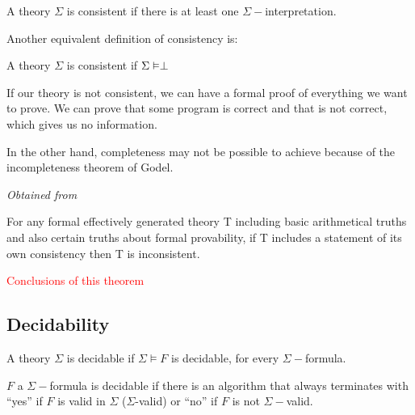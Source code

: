 \begin{defn}[Consistency]

	A theory $\Sigma$ is consistent if there is at least one $\Sigma-$interpretation.

	Another equivalent definition of consistency is:

	A theory $\Sigma$ is consistent if $\Sigma \vDash \perp$
\end{defn}

If our theory is not consistent, we can have a formal proof of everything we want to prove.
We can prove that some program is correct and that is not correct, which gives us no information. 

In the other hand, completeness may not be possible to achieve because of the incompleteness theorem of Godel.



\begin{itheorem}

\textit{Obtained from }

For any formal effectively generated theory T including basic arithmetical truths and also certain truths about formal provability, if T includes a statement of its own consistency then T is inconsistent.

\end{itheorem}

\textcolor{red}{Conclusions of this theorem}



\subsection{Decidability}

\begin{defn}

A theory $\Sigma$ is decidable if $\Sigma \vDash F$ is decidable, for every $\Sigma-$formula.

\end{defn}

\begin{defn}

$F$ a $\Sigma-$formula is decidable if there is an algorithm that always terminates with ``yes'' if $F$ is valid in $\Sigma$ ($\Sigma$-valid) or ``no'' if $F$ is not $\Sigma-$valid.
\end{defn}

